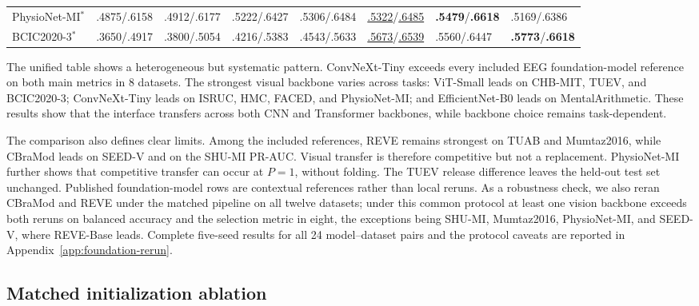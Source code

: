 \begin{table}[t]
\begin{tabularx}{\textwidth}{@{}p{1.45cm}*{7}{Y}@{}}
PhysioNet-MI$^*$ & .4875/.6158 & .4912/.6177 & .5222/.6427 & .5306/.6484 & \underline{.5322}/\underline{.6485} & \textbf{.5479}/\textbf{.6618} & .5169/.6386 \\
BCIC2020-3$^*$ & .3650/.4917 & .3800/.5054 & .4216/.5383 & .4543/.5633 & \underline{.5673}/\underline{.6539} & .5560/.6447 & \textbf{.5773}/\textbf{.6618} \\
\bottomrule
\end{tabularx}
\end{table}

The unified table shows a heterogeneous but systematic pattern. ConvNeXt-Tiny
exceeds every included EEG foundation-model reference on both main metrics in
8 datasets. The strongest visual backbone varies across tasks: ViT-Small
leads on CHB-MIT, TUEV, and BCIC2020-3; ConvNeXt-Tiny leads on ISRUC, HMC,
FACED, and PhysioNet-MI; and EfficientNet-B0 leads on MentalArithmetic.
These results show that the interface transfers across both CNN and Transformer
backbones, while backbone choice remains task-dependent.

The comparison also defines clear limits. Among the included references, REVE remains strongest on TUAB and
Mumtaz2016, while CBraMod leads on SEED-V and on the SHU-MI PR-AUC. Visual
transfer is therefore competitive but not a replacement. PhysioNet-MI further
shows that competitive transfer can occur at $P=1$, without folding. The TUEV release difference leaves the held-out test
set unchanged. Published foundation-model rows are contextual references
rather than local reruns. As a robustness check, we also reran CBraMod and
REVE under the matched pipeline on all twelve datasets; under this common
protocol at least one vision backbone exceeds both reruns on balanced
accuracy and the selection metric in
eight, the exceptions being SHU-MI, Mumtaz2016, PhysioNet-MI, and SEED-V,
where REVE-Base leads. Complete five-seed results for all
24 model--dataset pairs and the protocol caveats are reported in Appendix~\ref{app:foundation-rerun}.

\subsection{Matched initialization ablation}
\label{sec:pretraining-ablation}

